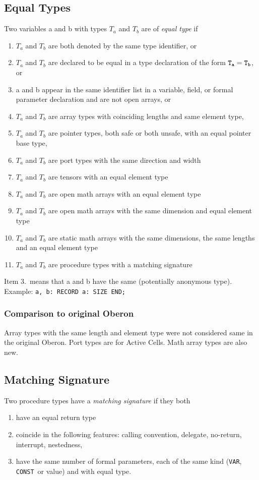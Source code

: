 \documentclass[a4wide,11pt]{article}
\newcommand{\CONST}{\lstinline"CONST"}
\newcommand{\VAR}{\lstinline"VAR"}
\begin{document}
\subsection{Equal Types}
Two variables a and b with types $T_a$ and $T_b$ are of \emph{equal type} if
\begin{enumerate}
\item $T_a$ and $T_b$ are both denoted by the same type identifier, or
\item $T_a$ and $T_b$ are declared to be equal in a type declaration of the form $\tt T_a = T_b$, or
\item a and b appear in the same identifier list in a variable, field, or formal parameter declaration and are not open arrays, or
\item $T_a$ and $T_b$ are array types with coinciding lengths and same element type,
\item $T_a$ and $T_b$ are pointer types, both safe or both unsafe, with an equal pointer base type,
\item $T_a$ and $T_b$ are port types with the same direction and width
\item $T_a$ and $T_b$ are tensors with an equal element type
\item $T_a$ and $T_b$ are open math arrays with an equal element type
\item $T_a$ and $T_b$ are open math arrays with the same dimension and equal element type
\item $T_a$ and $T_b$ are static math arrays with the same dimensions, the same lengths and an equal element type
\item $T_a$ and $T_b$ are procedure types with a matching signature
\end{enumerate}

\begin{annotation}
Item 3.\ means that a and b have the same (potentially anonymous type).
Example: \lstinline"a, b: RECORD a: SIZE END;"
\subsubsection{Comparison to original Oberon}
Array types with the same length and element type were not considered same in the original Oberon.
Port types are for Active Cells.
Math array types are also new.
\end{annotation}

\subsection{Matching Signature}\label{subsection: Matching Signature}
Two procedure types have a \emph{matching signature} if they both
\begin{enumerate}
\item have an equal return type
\item coincide in the following features: calling convention, delegate, no-return, interrupt, nestedness,
\item have the same number of formal parameters, each of the same kind (\VAR, \CONST\ or value) and with equal type.
\end{enumerate}
\end{document}
